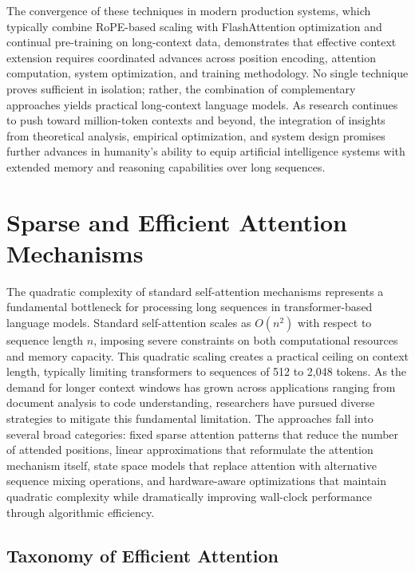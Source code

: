 The convergence of these techniques in modern production systems, which typically combine RoPE-based scaling with FlashAttention optimization and continual pre-training on long-context data, demonstrates that effective context extension requires coordinated advances across position encoding, attention computation, system optimization, and training methodology. No single technique proves sufficient in isolation; rather, the combination of complementary approaches yields practical long-context language models. As research continues to push toward million-token contexts and beyond, the integration of insights from theoretical analysis, empirical optimization, and system design promises further advances in humanity's ability to equip artificial intelligence systems with extended memory and reasoning capabilities over long sequences.
\section{Sparse and Efficient Attention Mechanisms}
\label{sec:sparse}

The quadratic complexity of standard self-attention mechanisms represents a fundamental bottleneck for processing long sequences in transformer-based language models. Standard self-attention scales as $O(n^2)$ with respect to sequence length $n$, imposing severe constraints on both computational resources and memory capacity. This quadratic scaling creates a practical ceiling on context length, typically limiting transformers to sequences of 512 to 2,048 tokens. As the demand for longer context windows has grown across applications ranging from document analysis to code understanding, researchers have pursued diverse strategies to mitigate this fundamental limitation. The approaches fall into several broad categories: fixed sparse attention patterns that reduce the number of attended positions, linear approximations that reformulate the attention mechanism itself, state space models that replace attention with alternative sequence mixing operations, and hardware-aware optimizations that maintain quadratic complexity while dramatically improving wall-clock performance through algorithmic efficiency.

\subsection{Taxonomy of Efficient Attention}

